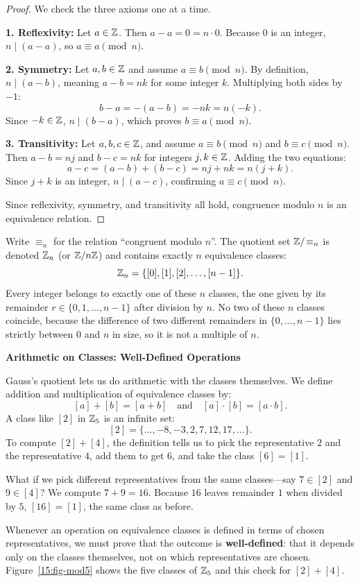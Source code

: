 \begin{proof}
We check the three axioms one at a time.

\textbf{1. Reflexivity:} Let $a \in \mathbb{Z}$. Then $a - a = 0 = n \cdot 0$. Because $0$ is an integer, $n \mid (a - a)$, so $a \equiv a \pmod n$.

\textbf{2. Symmetry:} Let $a, b \in \mathbb{Z}$ and assume $a \equiv b \pmod n$. 
By definition, $n \mid (a - b)$, meaning $a - b = n k$ for some integer $k$. 
Multiplying both sides by $-1$:
\[
b - a = -(a - b) = -nk = n(-k).
\]
Since $-k \in \mathbb{Z}$, $n \mid (b - a)$, which proves $b \equiv a \pmod n$.

\textbf{3. Transitivity:} Let $a, b, c \in \mathbb{Z}$, and assume $a \equiv b \pmod n$ and $b \equiv c \pmod n$.
Then $a - b = n j$ and $b - c = n k$ for integers $j, k \in \mathbb{Z}$. 
Adding the two equations:
\[
a - c = (a - b) + (b - c) = n j + n k = n(j + k).
\]
Since $j + k$ is an integer, $n \mid (a - c)$, confirming $a \equiv c \pmod n$.

Since reflexivity, symmetry, and transitivity all hold, congruence modulo $n$ is an equivalence relation.
\end{proof}

Write $\equiv_n$ for the relation ``congruent modulo $n$''. The quotient set $\mathbb{Z} / \!\equiv_n$ is denoted $\mathbb{Z}_n$ (or $\mathbb{Z}/n\mathbb{Z}$) and contains exactly $n$ equivalence classes:
\[
\mathbb{Z}_n = \{[0], [1], [2], \dots, [n-1]\}.
\]
Every integer belongs to exactly one of these $n$ classes, the one given by its remainder $r \in \{0, 1, \dots, n-1\}$ after division by $n$. No two of these $n$ classes coincide, because the difference of two different remainders in $\{0, \dots, n-1\}$ lies strictly between $0$ and $n$ in size, so it is not a multiple of $n$.

\begin{intuitionbox}
\textbf{Arithmetic on Classes: Well-Defined Operations}

Gauss's quotient lets us do arithmetic with the classes themselves. We define addition and multiplication of equivalence classes by:
\[
[a] + [b] = [a + b] \quad \text{and} \quad [a] \cdot [b] = [a \cdot b].
\]
A class like $[2]$ in $\mathbb{Z}_5$ is an infinite set:
\[
[2] = \{\dots, -8, -3, 2, 7, 12, 17, \dots\}.
\]
To compute $[2] + [4]$, the definition tells us to pick the representative $2$ and the representative $4$, add them to get $6$, and take the class $[6] = [1]$. 

What if we pick different representatives from the same classes---say $7 \in [2]$ and $9 \in [4]$? We compute $7 + 9 = 16$. Because $16$ leaves remainder $1$ when divided by $5$, $[16] = [1]$, the same class as before.

Whenever an operation on equivalence classes is defined in terms of chosen representatives, we must prove that the outcome is \textbf{well-defined}: that it depends only on the classes themselves, not on which representatives are chosen. Figure~\ref{15:fig-mod5} shows the five classes of $\mathbb{Z}_5$ and this check for $[2] + [4]$.
\end{intuitionbox}

